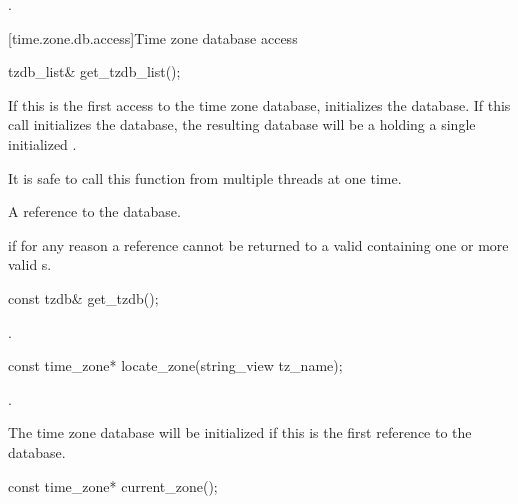 \begin{itemdescr}
\pnum
\returns
{}.
\end{itemdescr}

[time.zone.db.access]{Time zone database access}

%
\begin{itemdecl}
tzdb_list& get_tzdb_list();
\end{itemdecl}

\begin{itemdescr}
\pnum
\effects
If this is the first access to the time zone database,
initializes the database.
If this call initializes the database,
the resulting database will be a 
holding a single initialized .

\pnum
\sync
It is safe to call this function from multiple threads at one time.

\pnum
\returns
A reference to the database.

\pnum
\throws
{} if for any reason
a reference cannot be returned to a valid 
containing one or more valid s.
\end{itemdescr}

%
\begin{itemdecl}
const tzdb& get_tzdb();
\end{itemdecl}

\begin{itemdescr}
\pnum
\returns
{}.
\end{itemdescr}

%
\begin{itemdecl}
const time_zone* locate_zone(string_view tz_name);
\end{itemdecl}

\begin{itemdescr}
\pnum
\returns
{}.

\pnum
\begin{note}
The time zone database will be initialized
if this is the first reference to the database.
\end{note}
\end{itemdescr}

%
\begin{itemdecl}
const time_zone* current_zone();
\end{itemdecl}

